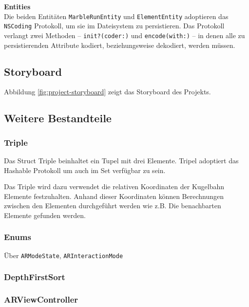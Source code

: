 \textbf{Entities} \\
Die beiden Entitäten \texttt{MarbleRunEntity} und \texttt{ElementEntity} adoptieren das \texttt{NSCoding} Protokoll, um sie im Dateisystem zu persistieren.
Das Protokoll verlangt zwei Methoden – \texttt{init?(coder:)} und \texttt{encode(with:)} – in denen alle zu persistierenden Attribute kodiert, beziehungsweise dekodiert, werden müssen.


\subsection{Storyboard}

Abbildung \ref{fig:project-storyboard} zeigt das Storyboard des Projekts.



\subsection{Weitere Bestandteile}

\subsubsection{Triple} \label{subsub:umsetzung-triple}
Das Struct Triple beinhaltet ein Tupel mit drei Elemente. Tripel adoptiert das Hashable Protokoll um auch im Set verfügbar zu sein.

Das Triple wird dazu verwendet die relativen Koordinaten der Kugelbahn Elemente festzuhalten. Anhand dieser Koordinaten können Berechnungen zwischen den Elementen durchgeführt werden wie z.B. Die benachbarten Elemente gefunden werden.

\subsubsection{Enums} \label{subsub:umsetzung-enums}

Über \texttt{ARModeState}, \texttt{ARInteractionMode}

\subsubsection{DepthFirstSort} \label{subsub:umsetzung-depthfirst}

\subsubsection{ARViewController} \label{subsub:umsetzung-arviewcontroller}

